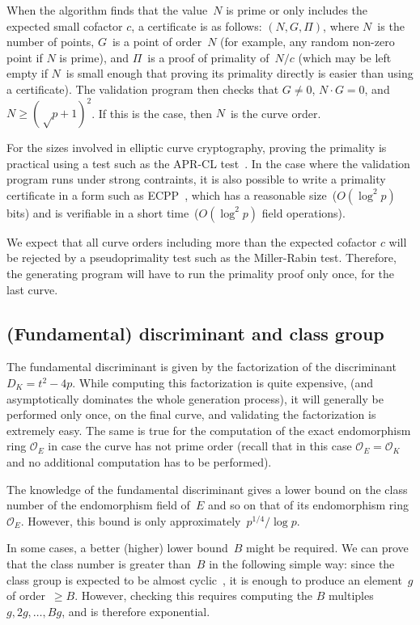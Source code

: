 \documentclass[twocolumn,letterpaper]{article}
\let\ro\mathcal
\begin{document}
When the algorithm finds that the value~$N$ is prime
or only includes the expected small cofactor $c$,
a certificate is as follows: $(N, G, Π)$,
where $N$~is the number of points,
$G$~is a point of order~$N$ (for example, any random non-zero point if $N$
is prime),
and $Π$~is a proof of primality of~$N/c$
(which may be left empty if $N$~is small enough
that proving its primality directly is easier than using a certificate).
The validation program then checks that $G ≠ 0$,
$N · G = 0$, and~$N ≥ (√p+1)^2$.
If this is the case, then $N$~is the curve order.

For the sizes involved in elliptic curve cryptography,
proving the primality is practical using a test such as
the APR-CL test~\cite{fcs1980adleman,mathcomp1984cl}.
In the case where the validation program runs under strong contraints,
it is also possible to write a primality certificate
in a form such as ECPP~\cite{mathcomp1993am},
which has a reasonable size~($O(\log^2 p)$ bits)
and is verifiable in a short time~($O(\log^2 p)$ field operations).

We expect that all curve orders including more than the expected cofactor $c$
will be rejected by a pseudoprimality test such as the Miller-Rabin test.
Therefore, the generating program will have to run the primality proof
only once, for the last curve.

\subsection{(Fundamental) discriminant and class group}

The fundamental discriminant is given by
the factorization of the discriminant~$D_K = t^2 - 4 p$.
While computing this factorization is quite expensive,
(and asymptotically dominates the whole generation process),
it will generally be performed only once, on the final curve,
and validating the factorization is extremely easy.
The same is true for the computation of the exact endomorphism
ring $\ro O_E$ in case the curve has not prime order (recall that
in this case $\ro O_E = \ro O_K$ and no additional computation has
to be performed).

The knowledge of the fundamental discriminant gives a lower bound
on the class number of the endomorphism field of~$E$
and so on that of its endomorphism ring~$\ro O_E$.
However, this bound is only approximately~$p^{1/4}/\log p$.

\smallskip

In some cases, a better (higher) lower bound~$B$ might be required.
We can prove that the class number is greater than~$B$
in the following simple way:
since the class group is expected to be almost cyclic~\cite{nt1984cl},
it is enough to produce an element~$g$ of order~$≥ B$.
However, checking this requires
computing the $B$ multiples~$g, 2g, …, B g$,
and is therefore exponential.
\end{document}
